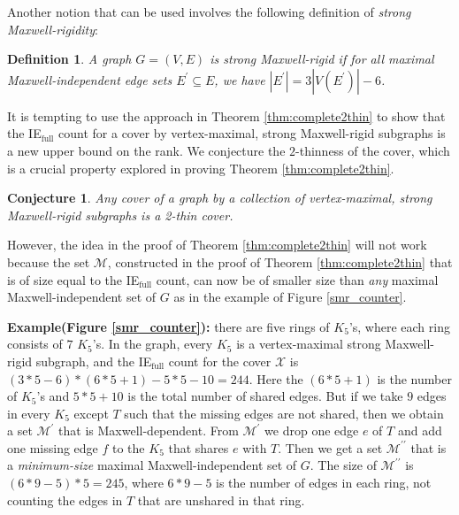 \documentclass[10pt]{article}
\def\M{\mathcal {M}}
\def\X{\mathcal {X}}
\newtheorem{dfn}{Definition}
\newtheorem{conjecture}{Conjecture}
\begin{document}
\medskip\noindent
Another notion that can be used involves the following definition of {\em strong Maxwell-rigidity}:
\begin{dfn}
A graph $G=(V, E)$ is \emph{strong Maxwell-rigid} if for all maximal Maxwell-independent edge sets $E^\prime \subseteq E$, we have $|E^\prime|
= 3|V(E^\prime)|-6$.
\end{dfn}

It is tempting to use the approach in Theorem \ref{thm:complete2thin} to show that the IE$_{\text{full}}$ count for a cover by vertex-maximal, strong Maxwell-rigid subgraphs is a new upper bound on the rank. We conjecture the $2$-thinness of the cover, which is a crucial property explored in proving Theorem \ref{thm:complete2thin}.
\begin{conjecture}\label{conj:strong2co}
Any cover of a graph by a collection of vertex-maximal, strong Maxwell-rigid subgraphs is a 2-thin cover.
\end{conjecture}



\medskip\noindent
However, the idea in the proof of Theorem \ref{thm:complete2thin} will not work because the set $\M$, constructed in the proof of Theorem \ref{thm:complete2thin} that is of size equal to the IE$_{\text{full}}$ count, can now be of smaller size than {\em any} maximal Maxwell-independent set of $G$ as in the example of Figure \ref{smr_counter}.

\medskip\noindent
{\bf Example(Figure \ref{smr_counter}):} there are
five rings of $K_5$'s, where each ring consists of $7$ $K_5$'s. In the graph,
every $K_5$ is a vertex-maximal strong Maxwell-rigid subgraph, and the
IE$_{\text{full}}$
count for the cover $\X$ is $(3*5-6 )* (6*5+1) - 5*5 -10 = 244$. Here the $(6*5+1)$ is the number of $K_5$'s and $5*5 + 10$ is the total number of shared edges. But if we take $9$
edges in every $K_5$ except $T$ such that the missing edges are not shared, then we obtain a set $\M^\prime$ that is Maxwell-dependent. From $\M^\prime$ we drop one edge $e$ of $T$ and add one missing edge $f$ to the $K_5$ that shares $e$ with $T$. Then we get a set $\M^{\prime\prime}$ that is a {\it minimum-size} maximal Maxwell-independent set of $G$. The size of $\M^{\prime\prime}$ is $(6*9-5)*5=245$, where $6*9-5$ is the number of edges in each ring, not counting the edges in $T$ that are unshared in that ring. 
\end{document}

